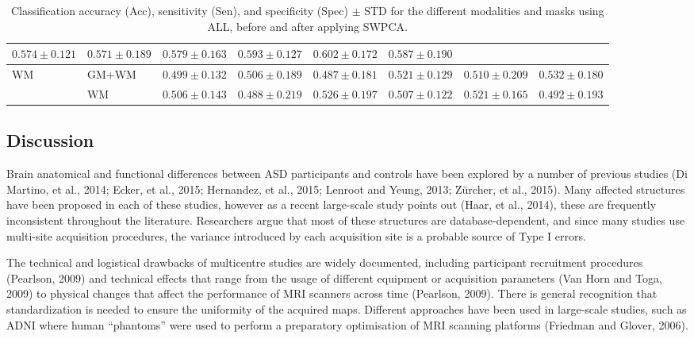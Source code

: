\begin{table}
\begin{tabularx}{\textwidth}{XX|XXX|XXX}
		$ 0.574 \pm 0.121 $ & $ 0.571 \pm 0.189 $ & $ 0.579 \pm 0.163 $ & $ 0.593 \pm 0.127 $ & $ 0.602 \pm 0.172 $ &   $ 0.587 \pm 0.190 $ \\
		\midrule
		\multirow{2}{*}{\ac{WM}} &GM+WM &
		$ 0.499 \pm 0.132 $ & $ 0.506 \pm 0.189 $ & $ 0.487 \pm 0.181 $ & $ 0.521 \pm 0.129 $ & $ 0.510 \pm 0.209 $ &  $ 0.532 \pm 0.180 $ \\
		&
		WM &
		$ 0.506 \pm 0.143 $ & $ 0.488 \pm 0.219 $ & $ 0.526 \pm 0.197 $ & $ 0.507 \pm 0.122 $ & $ 0.521 \pm 0.165 $ &   $ 0.492 \pm 0.193 $ \\
		\bottomrule
	\end{tabularx}
	\caption[Classification accuracy (Acc), sensitivity (Sen), and specificity (Spec) $\pm$ STD for the different modalities and masks using ALL, before and after applying \acs{SWPCA}.]{Classification accuracy (Acc), sensitivity (Sen), and specificity (Spec) $\pm$ STD for the different modalities and masks using ALL, before and after applying \ac{SWPCA}.}
	\label{tab:swpcaALL}
\end{table}

\subsection{Discussion}
Brain anatomical and functional differences between ASD participants and
controls have been explored by a number of previous studies (Di
Martino, et al., 2014; Ecker, et al., 2015; Hernandez, et al., 2015;
Lenroot and Yeung, 2013; Zürcher, et al., 2015). Many affected
structures have been proposed in each of these studies, however as a
recent large-scale study points out (Haar, et al., 2014), these are
frequently inconsistent throughout the literature. Researchers argue
that most of these structures are database-dependent, and since many
studies use multi-site acquisition procedures, the variance introduced
by each acquisition site is a probable source of Type I errors. 


	The technical and logistical drawbacks of multicentre studies are widely
	documented, including participant recruitment procedures (Pearlson,
	2009) and technical effects that range from the usage of different
	equipment or acquisition parameters (Van Horn and Toga, 2009) to
	physical changes that affect the performance of \ac{MRI} scanners across
	time (Pearlson, 2009). There is general recognition that
	standardization is needed to ensure the uniformity of the acquired
	maps. Different approaches have been used in large-scale studies, such
	as \ac{ADNI} where human
	“phantoms” were used to perform a preparatory optimisation of \ac{MRI}
	scanning platforms (Friedman and Glover, 2006). 


